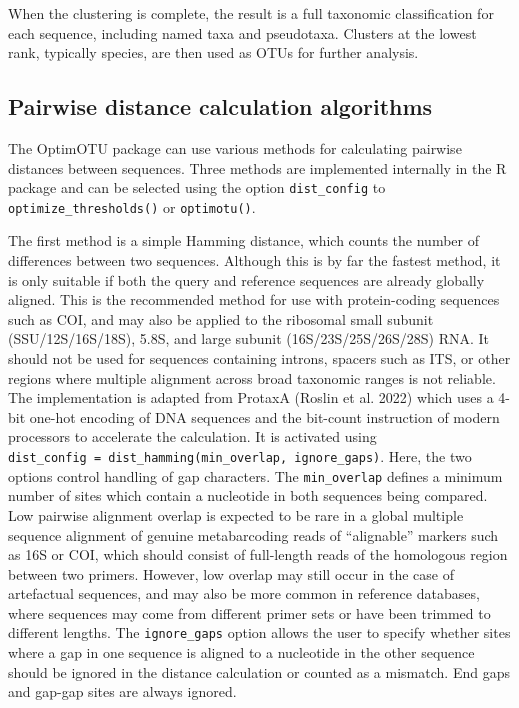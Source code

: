 \documentclass[
]{article}
\begin{document}
When the clustering is complete, the result is a full taxonomic classification for each sequence, including named taxa and pseudotaxa.
Clusters at the lowest rank, typically species, are then used as OTUs for further analysis.

\subsection{Pairwise distance calculation algorithms}\label{pairwise-distance-calculation-algorithms}

The OptimOTU package can use various methods for calculating pairwise distances between sequences.
Three methods are implemented internally in the R package and can be selected using the option \texttt{dist\_config} to \texttt{optimize\_thresholds()} or \texttt{optimotu()}.

The first method is a simple Hamming distance, which counts the number of differences between two sequences.
Although this is by far the fastest method, it is only suitable if both the query and reference sequences are already globally aligned.
This is the recommended method for use with protein-coding sequences such as COI, and may also be applied to the ribosomal small subunit (SSU/12S/16S/18S), 5.8S, and large subunit (16S/23S/25S/26S/28S) RNA.
It should not be used for sequences containing introns, spacers such as ITS, or other regions where multiple alignment across broad taxonomic ranges is not reliable.
The implementation is adapted from ProtaxA (Roslin et al. 2022) which uses a 4-bit one-hot encoding of DNA sequences and the bit-count instruction of modern processors to accelerate the calculation.
It is activated using \texttt{dist\_config\ =\ dist\_hamming(min\_overlap,\ ignore\_gaps)}.
Here, the two options control handling of gap characters.
The \texttt{min\_overlap} defines a minimum number of sites which contain a nucleotide in both sequences being compared.
Low pairwise alignment overlap is expected to be rare in a global multiple sequence alignment of genuine metabarcoding reads of ``alignable'' markers such as 16S or COI, which should consist of full-length reads of the homologous region between two primers.
However, low overlap may still occur in the case of artefactual sequences, and may also be more common in reference databases, where sequences may come from different primer sets or have been trimmed to different lengths.
The \texttt{ignore\_gaps} option allows the user to specify whether sites where a gap in one sequence is aligned to a nucleotide in the other sequence should be ignored in the distance calculation or counted as a mismatch.
End gaps and gap-gap sites are always ignored.
\end{document}
